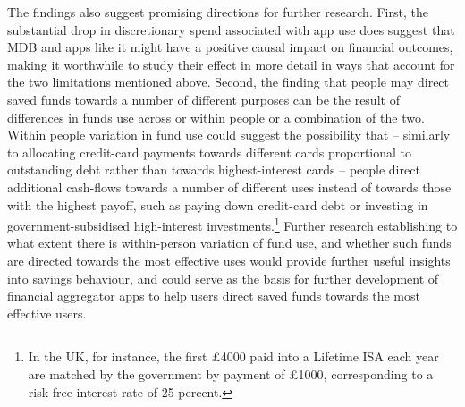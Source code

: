 The findings also suggest promising directions for further research. First, the
substantial drop in discretionary spend associated with app use does suggest
that MDB and apps like it might have a positive causal impact on financial
outcomes, making it worthwhile to study their effect in more detail in ways
that account for the two limitations mentioned above. Second, the finding that
people may direct saved funds towards a number of different purposes can be the
result of differences in funds use across or within people or a combination of
the two. Within people variation in fund use could suggest
the possibility that -- similarly to allocating credit-card payments towards
different cards proportional to outstanding debt rather than towards
highest-interest cards \citet{gathergood2019individuals} -- people direct
additional cash-flows towards a number of different uses instead of towards
those with the highest payoff, such as paying down credit-card debt or
investing in government-subsidised high-interest investments.\footnote{In the
UK, for instance, the first \pounds4000 paid into a Lifetime ISA each year are
matched by the government by payment of \pounds1000, corresponding to a
risk-free interest rate of 25 percent.} Further research establishing to what
extent there is within-person variation of fund use, and whether such funds are
directed towards the most effective uses would provide further useful insights
into savings behaviour, and could serve as the basis for further development of
financial aggregator apps to help users direct saved funds towards the most
effective users.


